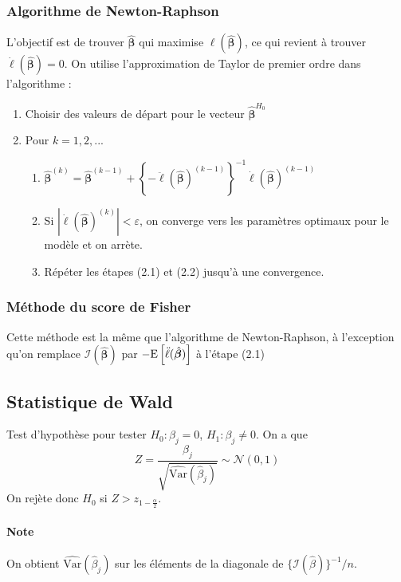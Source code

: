 \documentclass[10pt, french]{article}
\begin{document}
\begin{multicols*}{3}
\subsubsection*{Algorithme de Newton-Raphson}
L'objectif est de trouver $\hat{\bm{\beta}}$ qui maximise $\ell(\hat{\bm{\beta}})$, ce qui revient à trouver $\dot{\ell}(\hat{\bm{\beta}}) = 0$. On utilise l'approximation de Taylor de premier ordre dans l'algorithme : 
\begin{enumerate}[label = (\arabic*)]
\item Choisir des valeurs de départ pour le vecteur $\hat{\bm{\beta}}^{H_0}$
\item Pour $k = 1, 2, ...$
\begin{enumerate}[label = (2.\arabic*)]
	\item $\hat{\bm{\beta}}^{(k)} = \hat{\bm{\beta}}^{(k-1)} +  \left \{ - \ddot{\ell}(\hat{\bm{\beta}})^{(k-1)} \right \}^{-1} \dot{\ell}(\hat{\bm{\beta}})^{(k-1)}$
	\item Si $|\dot{\ell}(\hat{\bm{\beta}})^{(k)}| < \varepsilon $, on converge vers les paramètres optimaux pour le modèle et on arrète.
	\item Répéter les étapes (2.1) et (2.2) jusqu'à une convergence.
\end{enumerate}
\end{enumerate}

\subsubsection*{Méthode du score de Fisher}
Cette méthode est la même que l'algorithme de Newton-Raphson, à l'exception qu'on remplace $\mathcal{I} \left( \hat{\bm{\beta}} \right)$ par $- \mathrm{E} \left[ \ddot{\ell}(\hat{\bm{\beta}}) \right]$ à l'étape (2.1)

\subsection*{Statistique de Wald}
Test d'hypothèse pour tester $H_0 : \beta_j = 0$, $H_1 : \beta_j \neq 0$. On a que
\[Z = \frac{\beta_j}{\sqrt{\hat{\mathrm{Var}}(\hat{\beta}_j)}} \sim \mathcal{N}(0,1) \]
On rejète donc $H_0$ si $Z > z_{1 - \frac{\alpha}{2}}$.

\paragraph{Note} On obtient $\hat{\mathrm{Var}}(\hat{\beta}_j)$ sur les éléments de la diagonale de $\{ \mathcal{I}(\hat{\beta}) \}^{-1} / n$.


\end{multicols*}
\end{document}
